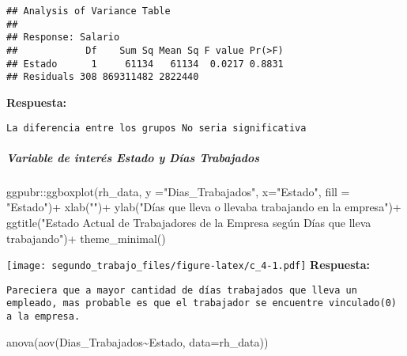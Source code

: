 \documentclass[
]{article}
\newenvironment{Shaded}{\begin{snugshade}}{\end{snugshade}}
\newcommand{\AttributeTok}[1]{\textcolor[rgb]{0.77,0.63,0.00}{#1}}
\newcommand{\FunctionTok}[1]{\textcolor[rgb]{0.00,0.00,0.00}{#1}}
\newcommand{\NormalTok}[1]{#1}
\newcommand{\SpecialCharTok}[1]{\textcolor[rgb]{0.00,0.00,0.00}{#1}}
\newcommand{\StringTok}[1]{\textcolor[rgb]{0.31,0.60,0.02}{#1}}
\begin{document}
\begin{verbatim}
## Analysis of Variance Table
## 
## Response: Salario
##            Df    Sum Sq Mean Sq F value Pr(>F)
## Estado      1     61134   61134  0.0217 0.8831
## Residuals 308 869311482 2822440
\end{verbatim}

\textbf{Respuesta:}

\begin{verbatim}
La diferencia entre los grupos No seria significativa
\end{verbatim}

\hypertarget{variable-de-interuxe9s-estado-y-duxedas-trabajados}{%
\subparagraph{Variable de interés Estado y Días
Trabajados}\label{variable-de-interuxe9s-estado-y-duxedas-trabajados}}

\begin{Shaded}
\begin{Highlighting}[]
\NormalTok{ggpubr}\SpecialCharTok{::}\FunctionTok{ggboxplot}\NormalTok{(rh\_data, }\AttributeTok{y =}\StringTok{"Dias\_Trabajados"}\NormalTok{, }\AttributeTok{x=}\StringTok{"Estado"}\NormalTok{, }\AttributeTok{fill =} \StringTok{"Estado"}\NormalTok{)}\SpecialCharTok{+}  
  \FunctionTok{xlab}\NormalTok{(}\StringTok{""}\NormalTok{)}\SpecialCharTok{+} \FunctionTok{ylab}\NormalTok{(}\StringTok{"Días que lleva o llevaba trabajando en la empresa"}\NormalTok{)}\SpecialCharTok{+}
  \FunctionTok{ggtitle}\NormalTok{(}\StringTok{"Estado Actual de Trabajadores de la Empresa según Días que lleva trabajando"}\NormalTok{)}\SpecialCharTok{+} 
  \FunctionTok{theme\_minimal}\NormalTok{()}
\end{Highlighting}
\end{Shaded}

\texttt{[image: segundo\_trabajo\_files/figure-latex/c\_4-1.pdf]}
\textbf{Respuesta:}

\begin{verbatim}
Pareciera que a mayor cantidad de días trabajados que lleva un empleado, mas probable es que el trabajador se encuentre vinculado(0) a la empresa.
\end{verbatim}

\begin{Shaded}
\begin{Highlighting}[]
\FunctionTok{anova}\NormalTok{(}\FunctionTok{aov}\NormalTok{(Dias\_Trabajados}\SpecialCharTok{\textasciitilde{}}\NormalTok{Estado, }\AttributeTok{data=}\NormalTok{rh\_data)) }
\end{Highlighting}
\end{Shaded}
\end{document}
